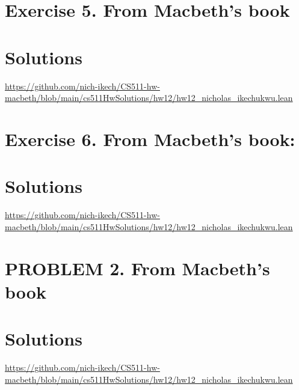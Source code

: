 \documentclass{article}
\begin{document}
\newpage

\section*{Exercise 5. From Macbeth's book}
\section*{Solutions}
\url{https://github.com/nich-ikech/CS511-hw-macbeth/blob/main/cs511HwSolutions/hw12/hw12_nicholas_ikechukwu.lean}

\newpage


\section*{Exercise 6. From Macbeth’s book:}
\section*{Solutions}
\url{https://github.com/nich-ikech/CS511-hw-macbeth/blob/main/cs511HwSolutions/hw12/hw12_nicholas_ikechukwu.lean}

\newpage

\section*{PROBLEM 2. From Macbeth's book}
\section*{Solutions}

\url{https://github.com/nich-ikech/CS511-hw-macbeth/blob/main/cs511HwSolutions/hw12/hw12_nicholas_ikechukwu.lean}
\end{document}
